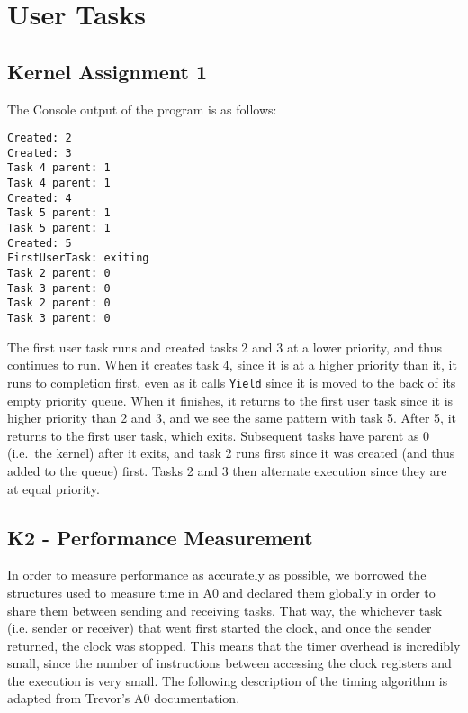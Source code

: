 \documentclass[12pt, titlepage]{article}
\begin{document}
    \section{User Tasks}

    \subsection{Kernel Assignment 1}
    The Console output of the program is as follows:
    \begin{verbatim}
Created: 2
Created: 3
Task 4 parent: 1
Task 4 parent: 1
Created: 4
Task 5 parent: 1
Task 5 parent: 1
Created: 5
FirstUserTask: exiting
Task 2 parent: 0
Task 3 parent: 0
Task 2 parent: 0
Task 3 parent: 0
    \end{verbatim}
    The first user task runs and created tasks 2 and 3 at a lower priority, and thus continues to run. When it creates task 4, since it is at a higher priority than it, it runs to completion first, even as it calls \verb`Yield` since it is moved to the back of its empty priority queue. When it finishes, it returns to the first user task since it is higher priority than 2 and 3, and we see the same pattern with task 5. After 5, it returns to the first user task, which exits. Subsequent tasks have parent as 0 (i.e.\ the kernel) after it exits, and task 2 runs first since it was created (and thus added to the queue) first. Tasks 2 and 3 then alternate execution since they are at equal priority.

    \subsection{K2 - Performance Measurement}

    In order to measure performance as accurately as possible, we borrowed the structures used to measure time in A0 and declared them globally in order to share them between sending and receiving tasks. That way, the whichever task (i.e. sender or receiver) that went first started the clock, and once the sender returned, the clock was stopped. This means that the timer overhead is incredibly small, since the number of instructions between accessing the clock registers and the execution is very small. The following description of the timing algorithm is adapted from Trevor's A0 documentation.
\end{document}
